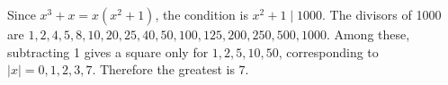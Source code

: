 Since $x^3+x=x(x^2+1)$, the condition is $x^2+1\mid1000$. The divisors of 1000 are $1,2,4,5,8,10,20,25,40,50,100,125,200,250,500,1000$. Among these, subtracting 1 gives a square only for $1,2,5,10,50$, corresponding to $|x|=0,1,2,3,7$. Therefore the greatest is $\boxed7$.
